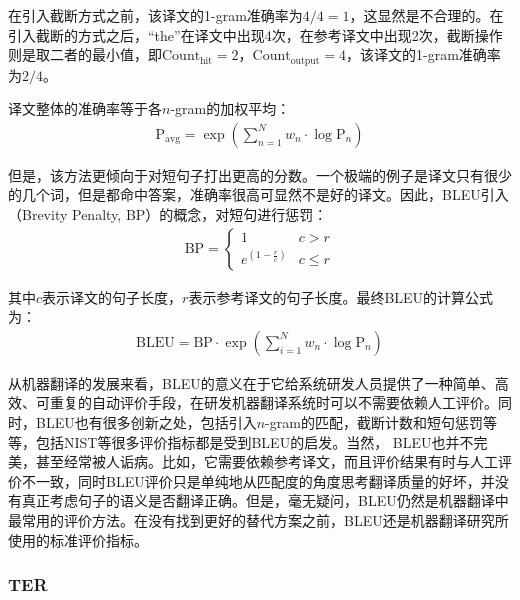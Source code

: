 \parinterval 在引入截断方式之前，该译文的1-gram准确率为$4/4=1$，这显然是不合理的。在引入截断的方式之后，``the''在译文中出现4次，在参考译文中出现2次，截断操作则是取二者的最小值，即$\textrm{Count}_{\textrm{hit}}= 2$，$\textrm{Count}_{\textrm{output}}= 4$，该译文的1-gram准确率为$2/4$。

\parinterval 译文整体的准确率等于各$n$-gram的加权平均：
\begin{eqnarray}
\textrm{P}_{\textrm{avg}}=\exp(\sum_{n=1}^Nw_n\cdot \log{\textrm{P}_n})
\label{eq:1-2}
\end{eqnarray}

\parinterval 但是，该方法更倾向于对短句子打出更高的分数。一个极端的例子是译文只有很少的几个词，但是都命中答案，准确率很高可显然不是好的译文。因此，BLEU引入{\small{}}（Brevity Penalty, BP）的概念，对短句进行惩罚：
\begin{eqnarray}
\textrm{BP}=
\begin{cases}
1& c>r\\
e^{(1-\frac{r}{c})}& c \le r
\end{cases}
\label{eq:1-3}
\end{eqnarray}

\noindent 其中$c$表示译文的句子长度，$r$表示参考译文的句子长度。最终BLEU的计算公式为：
\begin{eqnarray}
\textrm{BLEU}=\textrm{BP} \cdot \exp(\sum_{i=1}^{N}w_n \cdot \log{\textrm{P}_n})
\label{eq:1-4}
\end{eqnarray}

\parinterval 从机器翻译的发展来看，BLEU的意义在于它给系统研发人员提供了一种简单、高效、可重复的自动评价手段，在研发机器翻译系统时可以不需要依赖人工评价。同时，BLEU也有很多创新之处，包括引入$n$-gram的匹配，截断计数和短句惩罚等等，包括NIST等很多评价指标都是受到BLEU的启发。当然， BLEU也并不完美，甚至经常被人诟病。比如，它需要依赖参考译文，而且评价结果有时与人工评价不一致，同时BLEU评价只是单纯地从匹配度的角度思考翻译质量的好坏，并没有真正考虑句子的语义是否翻译正确。但是，毫无疑问，BLEU仍然是机器翻译中最常用的评价方法。在没有找到更好的替代方案之前，BLEU还是机器翻译研究所使用的标准评价指标。


\subsubsection{TER}

